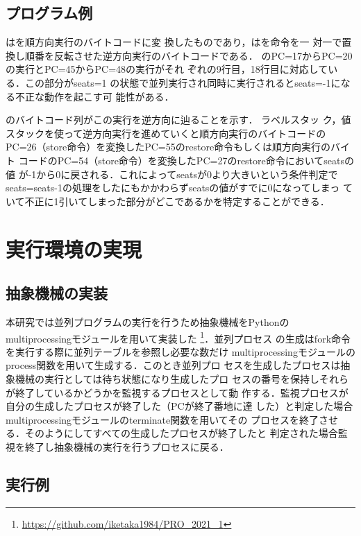 \documentclass[submit,PRO]{ipsj}
\begin{document}
\subsection{プログラム例}

はを順方向実行のバイトコードに変
換したものであり，はを命令を一
対一で置換し順番を反転させた逆方向実行のバイトコードである．
のPC=17からPC=20の実行とPC=45からPC=48の実行がそれ
ぞれの9行目，18行目に対応している．この部分がseats=1
の状態で並列実行され同時に実行されるとseats=-1になる不正な動作を起こす可
能性がある．

のバイトコード列がこの実行を逆方向に辿ることを示す．
ラベルスタッ
ク，値スタックを使って逆方向実行を進めていくと順方向実行のバイトコードの
PC=26（store命令）を変換したPC=55のrestore命令もしくは順方向実行のバイト
コードのPC=54（store命令）を変換したPC=27のrestore命令においてseatsの値
が-1から0に戻される．これによってseatsが0より大きいという条件判定で
seats=seats-1の処理をしたにもかかわらずseatsの値がすでに0になってしまっ
ていて不正に1引いてしまった部分がどこであるかを特定することができる．

\section{実行環境の実現}

\subsection{抽象機械の実装}

本研究では並列プログラムの実行を行うため抽象機械をPythonの
multiprocessingモジュールを用いて実装した
\footnote{\url{https://github.com/iketaka1984/PRO_2021_1}}．並列プロセス
の生成はfork命令を実行する際に並列テーブルを参照し必要な数だけ
multiprocessingモジュールのprocess関数を用いて生成する．このとき並列プロ
セスを生成したプロセスは抽象機械の実行としては待ち状態になり生成したプロ
セスの番号を保持しそれらが終了しているかどうかを監視するプロセスとして動
作する．監視プロセスが自分の生成したプロセスが終了した（PCが終了番地に達
した）と判定した場合multiprocessingモジュールのterminate関数を用いてその
プロセスを終了させる．そのようにしてすべての生成したプロセスが終了したと
判定された場合監視を終了し抽象機械の実行を行うプロセスに戻る．

\subsection{実行例}
\end{document}

